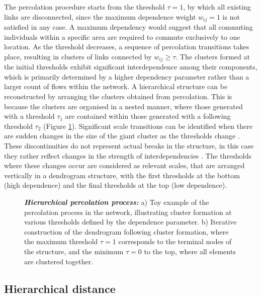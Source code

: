 \documentclass[11pt, a4paper]{article}
\begin{document}
The percolation procedure starts from the threshold $\tau= 1$, by which all existing links are disconnected, since the maximum dependence weight $w_{ij}=1$ is not satisfied in any case. A maximum dependency would suggest that all commuting individuals within a specific area are required to commute exclusively to one location. As the threshold decreases, a sequence of percolation transitions takes place, resulting in clusters of links connected by $w_{ij} \geq \tau$. The clusters formed at the initial thresholds exhibit significant interdependence among their components, which is primarily determined by a higher dependency parameter rather than a larger count of flows within the network. A hierarchical structure can be reconstructed by arranging the clusters obtained from percolation. This is because the clusters are organised in a nested manner, where those generated with a threshold $\tau_1$ are contained within those generated with a following threshold $\tau_2$ (Figure \ref{process}). Significant scale transitions can be identified when there are sudden changes in the size of the giant cluster as the thresholds change \citep{Arcaute2016}. These discontinuities do not represent actual breaks in the structure, in this case they rather reflect changes in the strength of interdependencies \citep{Simon1962,Holling2001UnderstandingSystems}. The thresholds where these changes occur are considered as relevant scales, that are arranged vertically in a dendrogram structure, with the first thresholds at the bottom (high dependence) and the final thresholds at the top (low dependence).

\begin{figure}[h!]
\centering
{}
\caption{\textit{\textbf{Hierarchical percolation process:}} a) Toy example of the percolation process in the network, illustrating cluster formation at various thresholds defined by the dependence parameter. b) Iterative construction of the dendrogram following cluster formation, where the maximum threshold $\tau=1$ corresponds to the terminal nodes of the structure, and the minimum $\tau =0$ to the top, where all elements are clustered together.}
\label{process}
\end{figure}


\subsection{Hierarchical distance}
\end{document}
